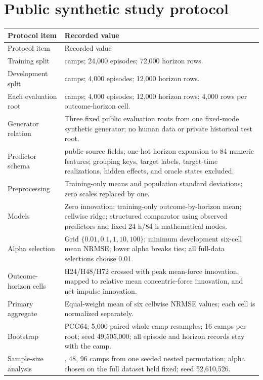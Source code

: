 \documentclass[10pt,a4paper]{article}
\begin{document}


\section{Public synthetic study protocol}

\begin{longtable}{>{\raggedright\arraybackslash}p{1.45in}>{\raggedright\arraybackslash}p{5.15in}}
\toprule
Protocol item & Recorded value \\
\midrule
\endfirsthead
\toprule
Protocol item & Recorded value \\
\midrule
\endhead
Training split & 96 camps; 24,000 episodes; 72,000 horizon rows. \\
Development split & 16 camps; 4,000 episodes; 12,000 horizon rows. \\
Each evaluation root & 16 camps; 4,000 episodes; 12,000 horizon rows; 4,000 rows per outcome-horizon cell. \\
Generator relation & Three fixed public evaluation roots from one fixed-mode synthetic generator; no human data or private historical test root. \\
Predictor schema & 82 public source fields; one-hot horizon expansion to 84 numeric features; grouping keys, target labels, target-time realizations, hidden effects, and oracle states excluded. \\
Preprocessing & Training-only means and population standard deviations; zero scales replaced by one. \\
Models & Zero innovation; training-only outcome-by-horizon mean; cellwise ridge; structured comparator using observed predictors and fixed 24 h/84 h mathematical modes. \\
Alpha selection & Grid \(\{0.01,0.1,1,10,100\}\); minimum development six-cell mean NRMSE; lower alpha breaks ties; all full-data selections choose 0.01. \\
Outcome-horizon cells & H24/H48/H72 crossed with peak mean-force innovation, mapped to relative mean concentric-force innovation, and net-impulse innovation. \\
Primary aggregate & Equal-weight mean of six cellwise NRMSE values; each cell is normalized separately. \\
Bootstrap & PCG64; 5,000 paired whole-camp resamples; 16 camps per root; seed 49,505,000; all episode and horizon records stay with the camp. \\
Sample-size analysis & 24, 48, 96 camps from one seeded nested permutation; alpha chosen on the full dataset held fixed; seed 52,610,526. \\
\bottomrule
\end{longtable}
\end{document}
